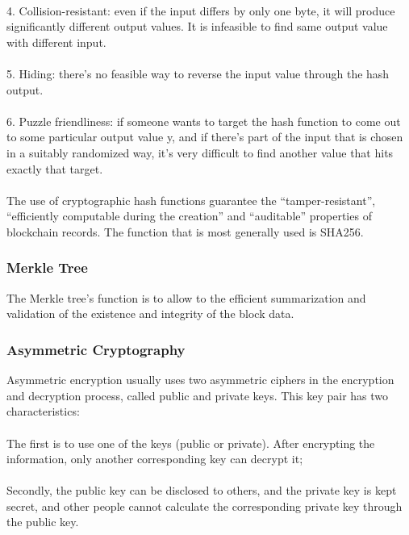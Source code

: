 \documentclass[doublespacing]{bmcart}
\begin{document}
\begin{CJK*}{UTF8}{gbsn}
\paragraph{}  4. Collision-resistant: even if the input differs by only one byte, it will produce significantly different output values. It is infeasible to find same output value with different input.
\paragraph{} 5. Hiding: there's no  feasible way to reverse the input value through the hash output.
\paragraph{} 6. Puzzle friendliness: if someone wants to target the hash function to come out to some
particular output value y, and if there’s part of the input that is chosen in a suitably randomized way,
it’s very difficult to find another value that hits exactly that target.
\paragraph{} The use of cryptographic hash functions guarantee the ``tamper-resistant'', ``efficiently computable during the creation'' and ``auditable'' properties of blockchain records. The function that is most generally used is SHA256.
\subsubsection*{Merkle Tree}
The Merkle tree's function is to allow to the efficient summarization and validation of the existence and integrity of the block data.
\subsubsection*{Asymmetric Cryptography}
Asymmetric encryption usually uses two asymmetric ciphers in the encryption and decryption process, called public and private keys. This key pair has two characteristics: \paragraph{} The first is to use one of the keys (public or private). After encrypting the information, only another corresponding key can decrypt it; 
\paragraph{} Secondly, the public key can be disclosed to others, and the private key is kept secret, and other people cannot calculate the corresponding private key through the public key. 

\end{CJK*}
\end{document}
